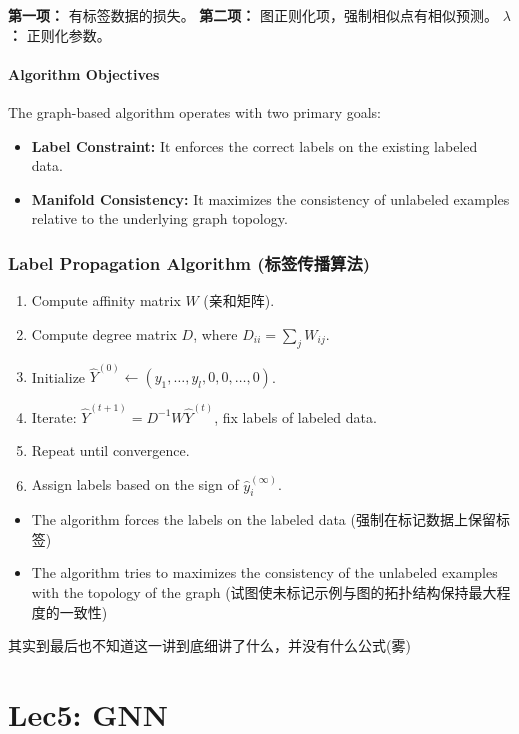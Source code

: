 \documentclass[UTF8]{ctexart}
\begin{document}
\textbf{第一项：} 有标签数据的损失。
\textbf{第二项：} 图正则化项，强制相似点有相似预测。
\textbf{$\lambda$：} 正则化参数。

\paragraph{Algorithm Objectives}
The graph-based algorithm operates with two primary goals:
\begin{itemize}
    \item \textbf{Label Constraint:} It enforces the correct labels on the existing labeled data.
    \item \textbf{Manifold Consistency:} It maximizes the consistency of unlabeled examples relative to the underlying graph topology.
\end{itemize}

\subsubsection{Label Propagation Algorithm (标签传播算法)}
\begin{enumerate}
    \item Compute affinity matrix $W$ (亲和矩阵).
    \item Compute degree matrix $D$, where $D_{ii} = \sum_j W_{ij}$.
    \item Initialize $\hat{Y}^{(0)} \leftarrow (y_1, \dots, y_l, 0, 0, \dots, 0)$.
    \item Iterate: $\hat{Y}^{(t+1)} = D^{-1}W\hat{Y}^{(t)}$, fix labels of labeled data.
    \item Repeat until convergence.
    \item Assign labels based on the sign of $\hat{y}_i^{(\infty)}$.
\end{enumerate}

\begin{itemize}
    \item The algorithm forces the labels on the labeled data (强制在标记数据上保留标签)
    \item The algorithm tries to maximizes the consistency of the unlabeled examples with the topology of the graph (试图使未标记示例与图的拓扑结构保持最大程度的一致性)
\end{itemize}
其实到最后也不知道这一讲到底细讲了什么，并没有什么公式(雾)

\section{Lec5: GNN}
\end{document}
